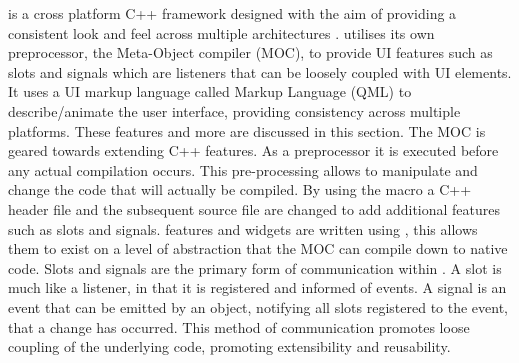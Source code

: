 is a cross platform C++ framework designed with the aim of providing a consistent look and feel across multiple architectures \cite{qt_about}.  utilises its own preprocessor, the Meta-Object compiler (MOC), to provide UI features such as slots and signals which are listeners that can be loosely coupled with UI elements. It uses a UI markup language called  Markup Language (QML) to describe/animate the user interface, providing consistency across multiple platforms. These features and more are discussed in this section.
  The MOC is geared towards extending C++ features. As a preprocessor it is executed before any actual compilation occurs\cite{qt_moc}. This pre-processing allows  to manipulate and change the code that will actually be compiled. By using the  macro a C++ header file and the subsequent source file are changed to add additional features such as slots and signals.  features and widgets are written using , this allows them to exist on a level of abstraction that the MOC can compile down to native code.
  Slots and signals are the primary form of communication within \cite{qt_slotsnsignals}. A slot is much like a listener, in that it is registered and informed of events. A signal is an event that can be emitted by an object, notifying all slots registered to the event, that a change has occurred. This method of communication promotes loose coupling of the underlying code, promoting extensibility and reusability.

